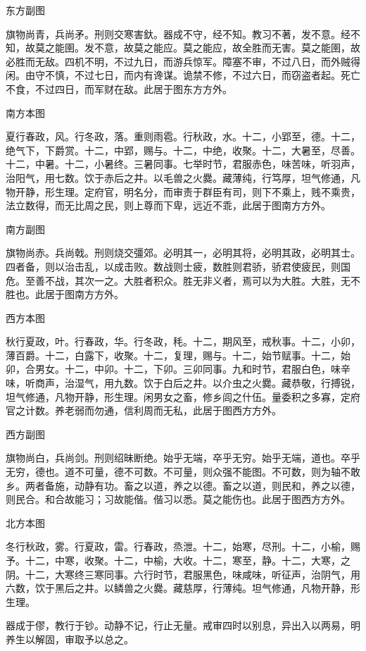\documentclass[]{article}
\begin{document}
东方副图

旗物尚青，兵尚矛。刑则交寒害釱。器成不守，经不知。教习不著，发不意。经不知，故莫之能圉。发不意，故莫之能应。莫之能应，故全胜而无害。莫之能圉，故必胜而无敌。四机不明，不过九日，而游兵惊军。障塞不审，不过八日，而外贼得闲。由守不慎，不过七日，而内有谗谋。诡禁不修，不过六日，而窃盗者起。死亡不食，不过四日，而军财在敌。此居于图东方方外。

南方本图

夏行春政，风。行冬政，落。重则雨雹。行秋政，水。十二，小郢至，德。十二，绝气下，下爵赏。十二，中郢，赐与。十二，中绝，收聚。十二，大暑至，尽善。十二，中暑。十二，小暑终。三暑同事。七举时节，君服赤色，味苦味，听羽声，治阳气，用七数。饮于赤后之井。以毛兽之火爨。藏薄纯，行笃厚，坦气修通，凡物开静，形生理。定府官，明名分，而审责于群臣有司，则下不乘上，贱不乘贵，法立数得，而无比周之民，则上尊而下卑，远近不乖，此居于图南方方外。

南方副图

旗物尚赤。兵尚戟。刑则烧交彊郊。必明其一，必明其将，必明其政，必明其士。四者备，则以治击乱，以成击败。数战则士疲，数胜则君骄，骄君使疲民，则国危。至善不战，其次一之。大胜者积众。胜无非义者，焉可以为大胜。大胜，无不胜也。此居于图南方方外。

西方本图

秋行夏政，叶。行春政，华。行冬政，秏。十二，期风至，戒秋事。十二，小卯，薄百爵。十二，白露下，收聚。十二，复理，赐与。十二，始节赋事。十二，始卯，合男女。十二，中卯。十二，下卯。三卯同事。九和时节，君服白色，味辛味，听商声，治湿气，用九数。饮于白后之井。以介虫之火爨。藏恭敬，行搏锐，坦气修通，凡物开静，形生理。闲男女之畜，修乡闾之什伍。量委积之多寡，定府官之计数。养老弱而勿通，信利周而无私，此居于图西方方外。

西方副图

旗物尚白，兵尚剑。刑则绍昧断绝。始乎无端，卒乎无穷。始乎无端，道也。卒乎无穷，德也。道不可量，德不可数。不可量，则众强不能图。不可数，则为轴不敢乡。两者备施，动静有功。畜之以道，养之以德。畜之以道，则民和，养之以德，则民合。和合故能习；习故能偕。偕习以悉。莫之能伤也。此居于图西方方外。

北方本图

冬行秋政，雾。行夏政，雷。行春政，烝泄。十二，始寒，尽刑。十二，小榆，赐予。十二，中寒，收聚。十二，中榆，大收。十二，寒至，静。十二，大寒，之阴。十二，大寒终三寒同事。六行时节，君服黑色，味咸味，听征声，治阴气，用六数，饮于黑后之井。以鳞兽之火爨。藏慈厚，行薄纯。坦气修通，凡物开静，形生理。

器成于僇，教行于钞。动静不记，行止无量。戒审四时以别息，异出入以两易，明养生以解固，审取予以总之。
\end{document}

